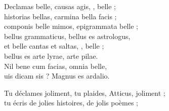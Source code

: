 \documentclass[12pt]{book} %
\begin{document}

\begin{alignment}
  \begin{edition}
      \begin{ekdverse}[type={distiques_élégiaques}]
        \begin{patverse*}
          Declamas belle, causas agis, , belle ; \\ 
          historias bellas, carmina bella facis ; \\ 
          componis belle mimos, epigrammata belle ; \\ 
          bellus grammaticus, bellus es astrologus, \\ 
          et belle cantas et saltas, , belle ; \\ 
          bellus es arte lyrae,  arte pilae. \\ 
          Nil bene cum facias,  omnia belle, \\ 
          uis dicam  sis ? Magnus es ardalio.  \\
        \end{patverse*}
    \end{ekdverse}
  \end{edition}
  \begin{translation}
    \begin{ekdverse}[type={distiques_élégiaques}]
        \begin{patverse*}
          Tu déclames joliment, tu plaides, Atticus, joliment ; \\ 
          tu écris de jolies histoires, de jolis poèmes ; \\ 

\end{patverse*}
\end{ekdverse}
\end{translation}
\end{alignment}
\end{document}

